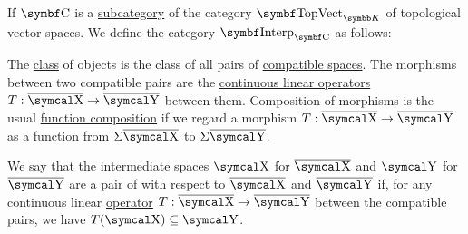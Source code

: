 \begin{definition}
\begin{DefEnum}
     If \( \Cat{C} \) is a \hyperref[def:subcategory]{subcategory} of the category \hyperref[def:category_of_topological_vector_spaces]{\( \Cat{TopVect}_{\BK} \)} of topological vector spaces. We define the category \( \Cat{Interp}_{\Cat{C}} \) as follows:
    \begin{RefList}
       The \hyperref[def:set_zfc]{class} of objects is the class of all pairs of \hyperref[def:interpolated_topological_vector_space/compatibility]{compatible spaces}.
       The morphisms between two compatible pairs are the \hyperref[def:interpolated_topological_vector_space/morphisms]{continuous linear operators} \( T: \Ol{\CX} \to \Ol{\CY} \) between them.
       Composition of morphisms is the usual \hyperref[def:function/composition]{function composition} if we regard a morphism \( T: \Ol{\CX} \to \Ol{\CY} \) as a function from \( \Sigma \Ol{\CX} \) to \( \Sigma \Ol{\CY} \).
    \end{RefList}

     We say that the intermediate spaces \( \CX \) for \( \Ol{\CX} \) and \( \CY \) for \( \Ol{\CY} \) are a pair of  with respect to \( \Ol{\CX} \) and \( \Ol{\CY} \) if, for any continuous linear \hyperref[def:interpolated_topological_vector_space/morphisms]{operator} \( T: \Ol{\CX} \to \Ol{\CY} \) between the compatible pairs, we have \( T(\CX) \subseteq \CY \).
  \end{DefEnum}
\end{definition}


